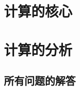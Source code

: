 \part{计算的核心}





\part{计算的分析}



\chapter*{所有问题的解答}
%    
    \begin{multicols}{2}\raggedcolumns
        \shipoutAnswer
    \end{multicols}





